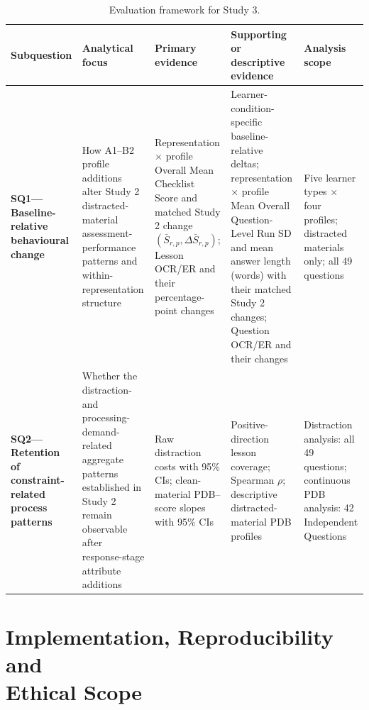 \begin{table}[H]
\centering
\caption{Evaluation framework for Study 3.}
\label{tab:study3-evaluation-framework}
\scriptsize
\setlength{\tabcolsep}{3pt}
\renewcommand{\arraystretch}{1.2}
\begin{tabularx}{\textwidth}{>{\raggedright\arraybackslash}p{}>{\raggedright\arraybackslash}p{}>{\raggedright\arraybackslash}X>{\raggedright\arraybackslash}p{}>{\raggedright\arraybackslash}p{}}
\toprule
\textbf{Subquestion} & \textbf{Analytical focus} & \textbf{Primary evidence} & \textbf{Supporting or descriptive evidence} & \textbf{Analysis scope} \\
\midrule
\textbf{SQ1---Baseline-relative behavioural change} & How A1--B2 profile additions alter Study 2 distracted-material assessment-performance patterns and within-representation structure & Representation $\times$ profile Overall Mean Checklist Score and matched Study 2 change $(\bar S_{r,p},\Delta\bar S_{r,p})$; Lesson OCR/ER and their percentage-point changes & Learner-condition-specific baseline-relative deltas; representation $\times$ profile Mean Overall Question-Level Run SD and mean answer length (words) with their matched Study 2 changes; Question OCR/ER and their changes & Five learner types $\times$ four profiles; distracted materials only; all 49 questions \\
\textbf{SQ2---Retention of constraint-related process patterns} & Whether the distraction- and processing-demand-related aggregate patterns established in Study 2 remain observable after response-stage attribute additions & Raw distraction costs with 95\% CIs; clean-material PDB--score slopes with 95\% CIs & Positive-direction lesson coverage; Spearman $\rho$; descriptive distracted-material PDB profiles & Distraction analysis: all 49 questions; continuous PDB analysis: 42 Independent Questions \\
\bottomrule
\end{tabularx}
\end{table}

\section[Implementation, Reproducibility and Ethical Scope]{Implementation, Reproducibility and\\ Ethical Scope}
\label{sec:implementation-reproducibility-ethics}

\mbox{}\par


